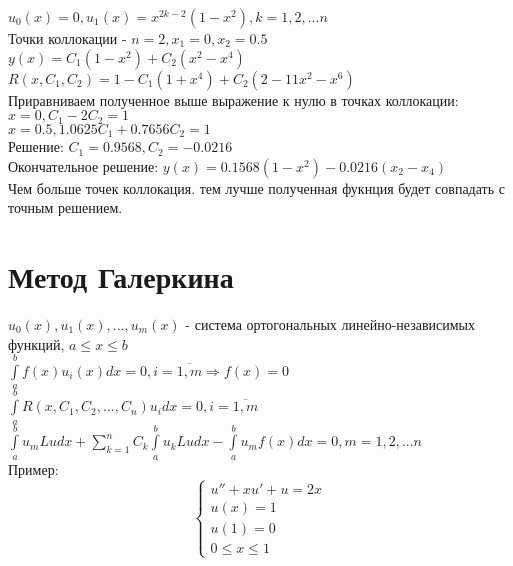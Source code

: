 $u_{0}(x) = 0, u_{1}(x) = x^{2k - 2}(1 - x^{2}), k = 1, 2, ... n$\\
Точки коллокации - $n = 2, x_{1} = 0, x_{2} = 0.5$\\

$y(x) = C_{1} (1 - x^{2}) + C_{2} (x^{2} - x^{4})$\\
$R(x, C_{1}, C_{2}) = 1 - C_{1} (1 + x^{4}) + C_{2} (2 - 11 x^{2} - x^{6})$\\
Приравниваем полученное выше выражение к нулю в точках коллокации:\\
$x = 0, C_{1} - 2C_{2} = 1$\\
$x = 0.5, 1.0625 C_{1} + 0.7656 C_{2} = 1$\\
Решение: $C_{1} = 0.9568, C_{2} = -0.0216$\\
Окончательное решение: $y(x) = 0.1568(1 - x^{2}) - 0.0216(x_{2} - x_{4})$\\

Чем больше точек коллокация. тем лучше полученная фукнция будет совпадать с точным решением.

\section{Метод Галеркина}
$u_{0}(x), u_{1}(x), ..., u_{m}(x)$ - система ортогональных линейно-независимых функций, $a \leqslant x \leqslant b$\\
$\int\limits_{a}^{b} f(x) u_{i}(x) dx = 0, i = \overline{1, m} \Rightarrow f(x) = 0$\\
$\int\limits_{a}^{b} R(x, C_{1}, C_{2}, ..., C_{n}) u_{i} dx  = 0, i = \overline{1, m}$\\
$\int\limits_{a}^{b} u_{m} L u dx + \sum\limits_{k=1}^{n} C_{k} \int\limits_{a}^{b} u_{k} L u dx - \int\limits_{a}^{b} u_{m} f(x) dx = 0, m = 1, 2, ...n$\\

Пример:\\
\begin{equation}
\begin{cases}
u'' + x u' + u = 2x\\
u(x) = 1\\
u(1) = 0\\
0 \leqslant x \leqslant 1
\end{cases}
\end{equation}

